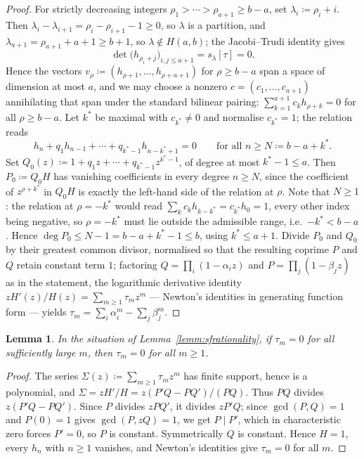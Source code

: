 \documentclass[11pt]{article}
\newtheorem{lemm}[theo]{Lemma}
\newcommand{\hook}[2]{H(#1,#2)}                   %
\begin{document}
\begin{proof}
For strictly decreasing integers
$\rho_{1}>\dotsb>\rho_{a+1}\ge b-a$, set
$\lambda_{i}\coloneqq\rho_{i}+i$. Then
$\lambda_{i}-\lambda_{i+1}=\rho_{i}-\rho_{i+1}-1\ge0$, so
$\lambda$ is a partition, and
$\lambda_{a+1}=\rho_{a+1}+a+1\ge b+1$, so
$\lambda\notin\hook{a}{b}$; the Jacobi--Trudi identity gives
\[
\det\bigl(h_{\rho_{i}+j}\bigr)_{i,j\le a+1}
=s_{\lambda}[\tau]=0 .
\]
Hence the vectors
$v_{\rho}\coloneqq(h_{\rho+1},\dotsc,h_{\rho+a+1})$ for
$\rho\ge b-a$ span a space of dimension at most $a$, and we may
choose a nonzero $c=(c_{1},\dotsc,c_{a+1})$ annihilating that
span under the standard bilinear pairing:
$\sum_{k=1}^{a+1}c_{k}h_{\rho+k}=0$ for all $\rho\ge b-a$. Let
$k^{*}$ be maximal with $c_{k^{*}}\ne0$ and normalise
$c_{k^{*}}=1$; the relation reads
\[
h_{n}+q_{1}h_{n-1}+\dotsb+q_{k^{*}-1}h_{n-k^{*}+1}=0
\qquad\text{for all }n\ge N\coloneqq b-a+k^{*} .
\]
Set $Q_{0}(z)\coloneqq1+q_{1}z+\dotsb+q_{k^{*}-1}z^{k^{*}-1}$, of
degree at most $k^{*}-1\le a$. Then $P_{0}\coloneqq Q_{0}H$ has
vanishing coefficients in every degree $n\ge N$, since the
coefficient of $z^{\rho+k^{*}}$ in $Q_{0}H$ is exactly the
left-hand side of the relation at $\rho$. Note that $N\ge1$: the
relation at $\rho=-k^{*}$ would read
$\sum_{k}c_{k}h_{k-k^{*}}=c_{k^{*}}h_{0}=1$, every other index
being negative, so $\rho=-k^{*}$ must lie outside the admissible
range, i.e.\ $-k^{*}<b-a$. Hence
$\deg P_{0}\le N-1=b-a+k^{*}-1\le b$, using $k^{*}\le a+1$.
Divide $P_{0}$ and $Q_{0}$ by their greatest common divisor,
normalised so that the resulting coprime $P$ and $Q$ retain
constant term $1$; factoring
$Q=\prod_{i}(1-\alpha_{i}z)$ and $P=\prod_{j}(1-\beta_{j}z)$ as
in the statement, the
logarithmic derivative identity
$zH'(z)/H(z)=\sum_{m\ge1}\tau_{m}z^{m}$ --- Newton's identities in
generating function form --- yields
$\tau_{m}=\sum_{i}\alpha_{i}^{m}-\sum_{j}\beta_{j}^{m}$.
\end{proof}

\begin{lemm}\label{lemm:rigidity}
In the situation of Lemma~\ref{lemm:sfrationality}, if
$\tau_{m}=0$ for all sufficiently large $m$, then $\tau_{m}=0$ for
all $m\ge1$.
\end{lemm}

\begin{proof}
The series $\Sigma(z)\coloneqq\sum_{m\ge1}\tau_{m}z^{m}$ has
finite support, hence is a polynomial, and
$\Sigma=zH'/H=z(P'Q-PQ')/(PQ)$. Thus $PQ$ divides
$z(P'Q-PQ')$. Since $P$ divides $zPQ'$, it divides $zP'Q$; since
$\gcd(P,Q)=1$ and $P(0)=1$ gives $\gcd(P,zQ)=1$, we get
$P\mid P'$, which in characteristic zero forces $P'=0$, so $P$ is
constant. Symmetrically $Q$ is constant. Hence $H=1$, every
$h_{n}$ with $n\ge1$ vanishes, and Newton's identities give
$\tau_{m}=0$ for all $m$.
\end{proof}
\end{document}

